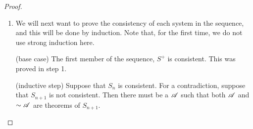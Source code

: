 \begin{proposition}
\begin{proof}
\begin{enumerate}
        We are finally capable of described the sequence of first order systems to be constructed. The first member \(S_0\), is \(S^+\). Every other member \(S_{n+1}\) of the sequence is an extension of the previous one with the additional axiom,
        \[\cug_{n} \text{, which is } (\sim(\forall x_{i_n})\cuf_n(x_{i_n})) \ra (\sim\cuf_n(c_n)).\]
        Note that \(\cug_n\) has the same meaning as the \wf{} which we previously stated that we would insert a version of as an axiom into each first order system. We choose to insert the contrapositive form only so that later parts of the proof will be slightly shorter.

        \item We will next want to prove the consistency of each system in the sequence, and this will be done by induction. Note that, for the first time, we do not use strong induction here.

          (base case) The first member of the sequence, \(S^+\) is consistent. This was proved in step 1.

          (inductive step) Suppose that \(S_n\) is consistent. For a contradiction, suppose that \(S_{n+1}\) is not consistent. Then there must be a \wf{} \(\mathscr{A}\) such that both \(\mathscr{A}\) and \(\sim\mathscr{A}\) are theorems of \(S_{n+1}\). 


\end{enumerate}
\end{proof}
\end{proposition}

